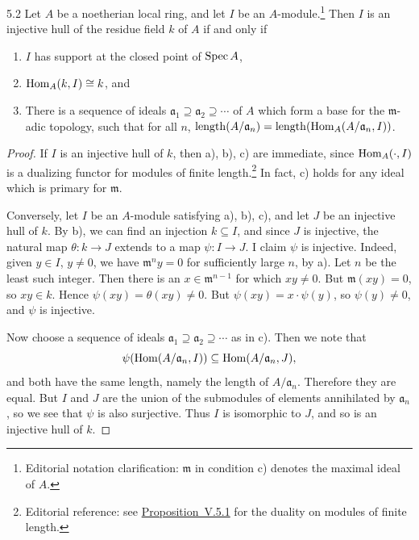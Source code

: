\begin{booklemma}{5.2}\label{lem:6.5.2}
Let $A$ be a noetherian local ring, and let $I$ be an $A$-module.\footnote{Editorial notation clarification: $\mathfrak m$ in condition c) denotes the maximal ideal of $A$.} Then $I$ is an injective hull of the residue field $k$ of $A$ if and only if
\begin{enumerate}
\item[a)] $I$ has support at the closed point of $\operatorname{Spec} A$,
\item[b)] $\operatorname{Hom}_{A}(k,I)\cong k$, and
\item[c)] There is a sequence of ideals $\mathfrak{a}_1\supseteq\mathfrak{a}_2\supseteq\cdots$ of $A$ which form a base for the $\mathfrak{m}$-adic topology, such that for all $n$, $\operatorname{length}(A/\mathfrak{a}_n) = \operatorname{length}(\operatorname{Hom}_A(A/\mathfrak{a}_n, I))$.
\end{enumerate}
\end{booklemma}

\begin{proof}
If $I$ is an injective hull of $k$, then a), b), c) are immediate, since $\operatorname{Hom}_A(\cdot,I)$ is a dualizing functor for modules of finite length.\footnote{Editorial reference: see \hyperref[prop:5.5.1]{Proposition~V.5.1} for the duality on modules of finite length.} In fact, c) holds for any ideal which is primary for $\mathfrak{m}$.

Conversely, let $I$ be an $A$-module satisfying a), b), c), and let $J$ be an injective hull of $k$. By b), we can find an injection $k\subseteq I$, and since $J$ is injective, the natural map $\theta\colon k\to J$ extends to a map $\psi\colon I\to J$. I claim $\psi$ is injective. Indeed, given $y\in I$, $y\neq0$, we have $\mathfrak{m}^n y=0$ for sufficiently large $n$, by a). Let $n$ be the least such integer. Then there is an $x\in\mathfrak{m}^{n-1}$ for which $xy\neq0$. But $\mathfrak{m}(xy)=0$, so $xy\in k$. Hence $\psi(xy)=\theta(xy)\neq0$. But $\psi(xy)=x\cdot\psi(y)$, so $\psi(y)\neq0$, and $\psi$ is injective.

Now choose a sequence of ideals $\mathfrak{a}_1\supseteq\mathfrak{a}_2\supseteq\cdots$ as in c). Then we note that
\[
\psi(\operatorname{Hom}(A/\mathfrak{a}_n,I)) \subseteq \operatorname{Hom}(A/\mathfrak{a}_n,J),
\]
and both have the same length, namely the length of $A/\mathfrak{a}_n$. Therefore they are equal. But $I$ and $J$ are the union of the submodules of elements annihilated by $\mathfrak{a}_n$, so we see that $\psi$ is also surjective. Thus $I$ is isomorphic to $J$, and so is an injective hull of $k$.
\end{proof}

